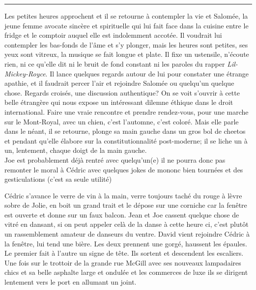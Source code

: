 \begin{center}\noindent\rule{0.5\textwidth}{0.4pt}\end{center} Les petites
heures approchent et il se retourne à contempler la vie et Salomée, la jeune
femme avocate sincère et spirituelle qui lui fait face dans la cuisine entre le
fridge et le comptoir auquel elle est indolemment accotée. Il voudrait lui
contempler les bas-fonds de l'âme et s'y plonger, mais les heures sont petites,
ses yeux sont vitreux, la musique se fait longue et plate.  Il fixe un
ustensile, n'écoute rien, ni ce qu'elle dit ni le bruit
de fond constant ni les paroles du rapper \textit{Lil-Mickey-Royce}. Il lance
quelques regards autour de lui pour constater une étrange apathie, et il
faudrait percer l'air et rejoindre Salomée ou quelqu'un quelque chose.
Regards croisés, une discussion authentique? On se voit s'ouvrir à cette
belle étrangère qui nous expose un intéressant dilemne éthique dans le droit
international. Faire une vraie rencontre et prendre rendez-vous, pour une
marche sur le Mont-Royal, avec un chien, c'est l'automne, c'est coloré. Mais
elle parle dans le néant, il se retourne,
plonge sa main gauche dans un gros bol de
cheetos et pendant qu'elle élabore sur la constitutionnalité post-moderne;
il se liche un à un, lentement, chaque doigt de la main gauche. \\


Joe est probablement déjà rentré avec quelqu'un(e) il ne pourra donc pas
remonter le moral à Cédric avec quelques jokes de mononc bien tournées et des
gesticulations (c'est sa seule utilité)

Cédric s'avance le verre de vin à la main, verre toujours
taché du rouge à lèvre sobre de Jolie, en boit un grand trait et le dépose sur
une corniche car la fenêtre est ouverte et donne sur un faux balcon. Jean et Joe
cassent quelque chose de vitré en dansant, si on peut appeler celà de
la danse à cette heure ci, c'est plutôt un rassemblement amateur de danseurs
du ventre. David vient rejoindre Cédric à la fenêtre, lui tend une bière.
Les deux prennent une gorgé, haussent les épaules. Le premier fait à l'autre un
signe de tête. Ils sortent et descendent les escaliers.\\

Une fois
sur le trottoir de la grande
rue McGill avec ses nouveaux lampadaires chics et sa belle asphalte large et
ondulée et les commerces de luxe ils se dirigent lentement vers le port en
allumant un joint. 

